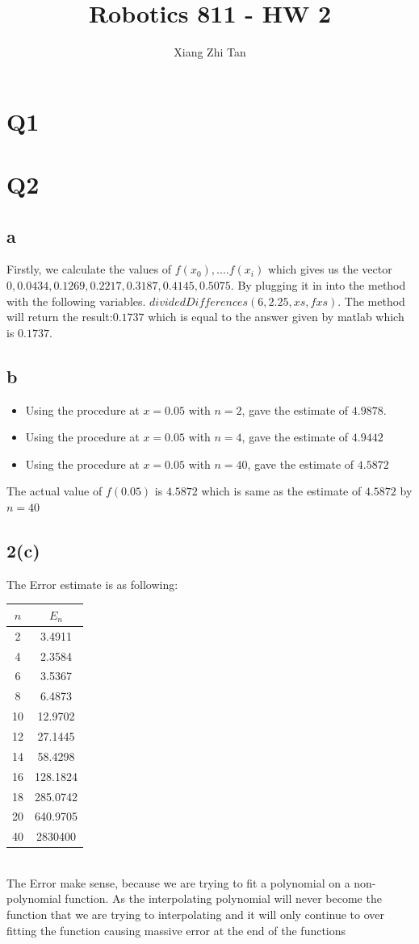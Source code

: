 \documentclass{article}
\begin{document}
\title{Robotics 811 - HW 2}
\author{Xiang Zhi Tan}

\maketitle

\section{Q1}
\section{Q2}
\subsection*{a}
Firstly, we calculate the values of $f(x_0),....f(x_i)$ which gives us the vector $0, 0.0434,
0.1269, 0.2217, 0.3187, 0.4145, 0.5075$. By plugging it in into the method with the following variables.
$dividedDifferences(6,2.25,xs,fxs)$. The method will return the result:$0.1737$ 
which is equal to the answer given by matlab which is $0.1737$.
\subsection*{b}
\begin{itemize}
	\item Using the procedure at $x=0.05$ with $n=2$, gave the estimate of $4.9878$.
	\item Using the procedure at $x=0.05$ with $n=4$, gave the estimate of $4.9442$
	\item Using the procedure at $x=0.05$ with $n=40$, gave the estimate of $4.5872$
\end{itemize}
The actual value of $f(0.05)$ is $4.5872$ which is same as the estimate of $4.5872$ by $n=40$
\subsection*{2(c)}
The Error estimate is as following:\\
\begin{tabular}{|c|c|}
\hline
$n$ & $E_n$ \\ \hline
2 & 3.4911\\
4 & 2.3584\\
6 & 3.5367\\
8 & 6.4873\\
10 & 12.9702\\
12 & 27.1445\\
14 & 58.4298\\
16 & 128.1824\\
18 & 285.0742\\
20 & 640.9705\\
40 & 2830400\\
\hline
\end{tabular}\\
The Error make sense, because we are trying to fit a polynomial on a non-polynomial function. As the interpolating polynomial will never become the function that we are trying to interpolating and it will only continue to over fitting the function causing massive error at the end of the functions
\end{document}
